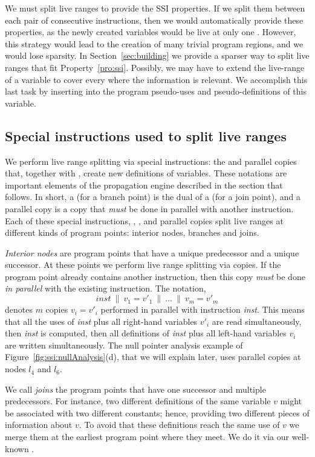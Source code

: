 We must split live ranges to provide the SSI properties.
If we split them between each pair of consecutive instructions, then we would automatically provide these properties, as the newly created variables
would be live at only one \progpoint.
However, this strategy would lead to the creation of many trivial program regions, and we would lose sparsity.
In Section~\ref{sec:building} we provide a sparser way to split live ranges that fit Property~\ref{pro:ssi}.
Possibly, we may have to extend the live-range of a variable to cover every \progpoint where the information is relevant.
We accomplish this last task by inserting into the program pseudo-uses and pseudo-definitions of this variable.

\subsection{Special instructions used to split live ranges}
\label{sub:ssi:split}

We perform live range splitting via special instructions: the \sigmafuns and parallel copies that, together with \phifuns, create new definitions of variables.
These notations are important elements of the propagation engine described in the section that follows.
In short, a \sigmafun (for a branch point) is the dual of a \phifun (for a join point), and a parallel copy is a copy that \emph{must} be done in parallel with another instruction.
Each of these special instructions, \phifun, \sigmafuns, and parallel copies split live ranges at different kinds of program points: interior nodes, branches and joins.

\emph{Interior nodes} are program points that have a unique predecessor and a unique successor.
At these points we perform live range splitting via copies.
If the program point already contains another instruction, then this copy \emph{must} be done \emph{in parallel} with the existing instruction.
The notation, \[\textit{inst} \ \parallel\  v_1=v'_1 \ \parallel\  \dots \ \parallel\  v_m=v'_m\] denotes $m$ copies $v_i=v'_i$ performed in parallel with
instruction \textit{inst}.
This means that all the uses of \textit{inst} plus all right-hand variables $v'_i$ are read simultaneously, then \textit{inst} is computed, then all definitions of \textit{inst} plus all left-hand variables $v_i$ are written simultaneously.
The null pointer analysis example of Figure~\ref{fig:ssi:nullAnalysis}(d), that we will explain later, uses parallel copies at nodes $l_4$ and $l_6$.


We call {\em joins} the program points that have one successor and multiple predecessors.
For instance, two different definitions of the same variable $v$ might be associated with two different constants; hence, providing two different pieces of information about $v$.
To avoid that these definitions reach the same use of $v$ we merge them at the earliest program point where they meet.
We do it via our well-known \phifuns.

